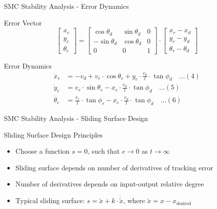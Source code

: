 \documentclass[10pt]{beamer}
\begin{document}
\begin{frame}{SMC Stability Analysis - Error Dynamics}
  \begin{block}{Error Vector}
    $$\begin{bmatrix} x_e \\ y_e \\ \theta_e \end{bmatrix} = \begin{bmatrix} \cos\theta_d & \sin\theta_d & 0 \\ -\sin\theta_d & \cos\theta_d & 0 \\ 0 & 0 & 1 \end{bmatrix} \cdot \begin{bmatrix} x_r - x_d \\ y_r - y_d \\ \theta_r - \theta_d \end{bmatrix}$$
  \end{block}

  \begin{block}{Error Dynamics}
    \begin{align}
      \dot{x}_e &= -v_d + v_r \cdot \cos\theta_e + y_e \cdot \frac{v_d}{l} \cdot \tan\phi_d \quad \ldots (4) \\
      \dot{y}_e &= v_r \cdot \sin\theta_e - x_e \cdot \frac{v_d}{l} \cdot \tan\phi_d \quad \ldots (5) \\
      \dot{\theta}_e &= \frac{v_r}{l} \cdot \tan\phi_r - x_e \cdot \frac{v_d}{l} \cdot \tan\phi_d \quad \ldots (6)
    \end{align}
  \end{block}
\end{frame}

\begin{frame}{SMC Stability Analysis - Sliding Surface Design}
  \begin{block}{Sliding Surface Design Principles}
    \begin{itemize}
      \item Choose a function $s = 0$, such that $e \to 0$ as $t \to \infty$
      \item Sliding surface depends on number of derivatives of tracking error
      \item Number of derivatives depends on input-output relative degree
      \item Typical sliding surface: $s = \tilde{x} + k \cdot \dot{\tilde{x}}$, where $\tilde{x} = x - x_{\text{desired}}$
    \end{itemize}
  \end{block}
\end{frame}
\end{document}

